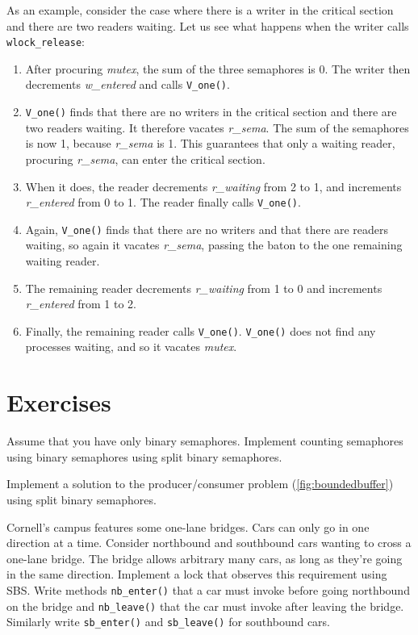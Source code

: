 \documentclass{report}
\begin{document}
As an example, consider the case where there is a writer in the critical
section and there are two readers waiting.  Let us see what happens when
the writer calls \texttt{wlock\_release}:
\begin{enumerate}
\item After procuring \textit{mutex},
the sum of the three semaphores is 0.  The writer then decrements
\textit{w\_entered} and calls \texttt{V\_one()}.
\item \texttt{V\_one()} finds that there are no writers in the critical section
and there are two readers waiting.  It therefore vacates \textit{r\_sema}.
The sum of the semaphores is now 1, because \textit{r\_sema} is 1.  This
guarantees that only a waiting reader, procuring \textit{r\_sema}, can enter
the critical section.
\item When it does, the reader decrements \textit{r\_waiting}
from 2 to 1, and increments \textit{r\_entered} from 0 to 1.
The reader finally calls \texttt{V\_one()}.
\item Again, \texttt{V\_one()} finds that there are no writers and
that there are readers waiting, so again it vacates \textit{r\_sema},
passing the baton to the one remaining waiting reader.
\item The remaining reader decrements \textit{r\_waiting} from 1 to 0 and
increments \textit{r\_entered} from 1 to 2.
\item Finally, the remaining reader  calls \texttt{V\_one()}.
\texttt{V\_one()} does not find any processes waiting,
and so it vacates \textit{mutex}.
\end{enumerate}

\section*{Exercises}
\begin{problems}
\item Assume that you have only binary semaphores.
Implement counting semaphores using binary semaphores using split binary semaphores.
\item Implement a solution to the producer/consumer problem
(\autoref{fig:boundedbuffer}) using split binary semaphores.
\item \label{ex:onelane} Cornell's campus features some one-lane bridges.
Cars can only go in one direction at a time. Consider northbound
and southbound cars wanting to cross a one-lane bridge.
The bridge allows arbitrary many cars, as long as they're going in the
same direction.
Implement a lock that observes this requirement using SBS.  Write methods
\texttt{nb\_enter()} that a car must invoke before going northbound on
the bridge and \texttt{nb\_leave()} that the car must invoke after leaving
the bridge.  Similarly write \texttt{sb\_enter()} and \texttt{sb\_leave()}
for southbound cars.

\end{problems}
\end{document}
